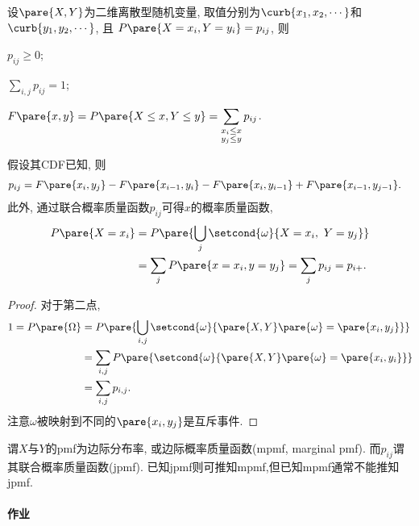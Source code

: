 \documentclass{ctexart}
\begin{document}
\begin{sample}
    \begin{ex}
        设$\pare{X,Y}$为二维离散型随机变量, 取值分别为$\curb{x_1,x_2,\cdots}$和$\curb{y_1,y_2,\cdots}$, 且
        $P\pare{X=x_i,Y=y_i} = p_{ij}$, 则
        \begin{cenum}
            \item $p_{ij} \ge 0$;
            \item $\displaystyle \sum_{i,j} p_{ij} = 1$;
            \item $F\pare{x,y} = P\pare{X\le x, Y\le y} = \displaystyle \sum_{\substack{x_i\le x\\ y_j\le y}} p_{ij}$.
        \end{cenum}
        假设其CDF已知, 则
        \begin{align*}
            p_{ij} &= F\pare{x_i, y_j} - F\pare{x_{i-1},y_i} - F\pare{x_i, y_{i-1}} + F\pare{x_{i-1},y_{j-1}}.
        \end{align*}
        此外, 通过联合概率质量函数$p_{ij}$可得$x$的概率质量函数,
        \begin{align*}
            P\pare{X=x_i} &= P\pare{\bigcup_{j} \setcond{\omega}{X = x_i,\ Y = y_j}} \\
            &= \sum_j P\pare{x = x_i, y = y_j} = \sum_j p_{ij} = p_{i+}.
        \end{align*}
    \end{ex}
    \begin{proof}
        对于第二点,
        \begin{align*}
            1 = P\pare{\Omega} &= P\pare{\bigcup_{i,j} \setcond{\omega}{\pare{X,Y}\pare{\omega} = \pare{x_i,y_j}}} \\
            &= \sum_{i,j} P\pare{\setcond{\omega}{\pare{X,Y}\pare{\omega} = \pare{x_i,y_i}}} \\
            &= \sum_{i,j} p_{i,j}.
        \end{align*}
        注意$\omega$被映射到不同的$\pare{x_i, y_j}$是互斥事件.
    \end{proof}
\end{sample}
谓$X$与$Y$的pmf为边际分布率, 或边际概率质量函数(mpmf, marginal pmf). 而$p_{ij}$谓其联合概率质量函数(jpmf). 已知jpmf则可推知mpmf,但已知mpmf通常不能推知jpmf.

\paragraph{作业} %
\label{par:作业}
\end{document}
